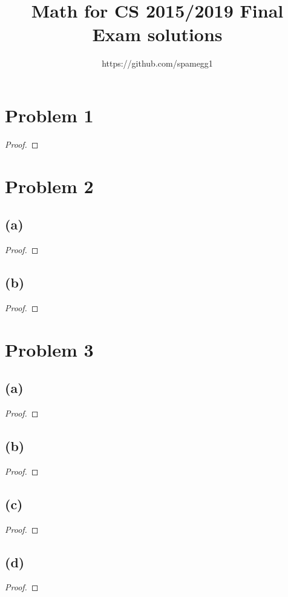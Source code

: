 \documentclass[14pt]{extarticle}
\title{Math for CS 2015/2019 Final Exam solutions}
\author{https://github.com/spamegg1}
\begin{document}
\maketitle
\tableofcontents

\section{Problem 1}

\begin{proof}

\end{proof}

\section{Problem 2}
\subsection{(a)}

\begin{proof}
\end{proof}

\subsection{(b)}
\begin{proof}
\end{proof}

\section{Problem 3}

\subsection{(a)}
\begin{proof}
\end{proof}

\subsection{(b)}
\begin{proof}
\end{proof}

\subsection{(c)}
\begin{proof}
\end{proof}

\subsection{(d)}
\begin{proof}
\end{proof}
\end{document}
